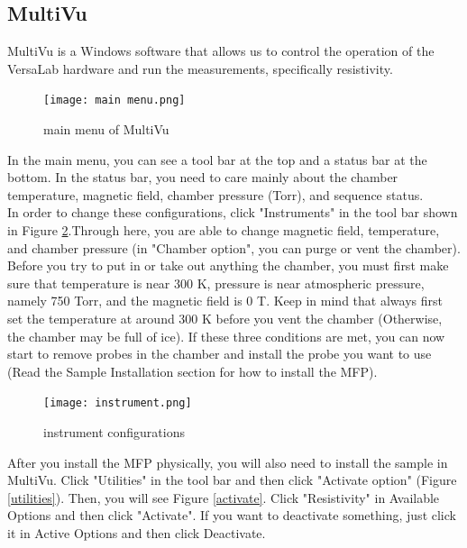 \documentclass{article}
\begin{document}
    \subsection{MultiVu}
    
        MultiVu is a Windows software that allows us to control the operation of the VersaLab hardware and run the measurements, specifically resistivity.\\
        \begin{figure}[H]
            \centering
            \texttt{[image: main menu.png]}
            \caption{main menu of MultiVu}
            \label{main menu}
        \end{figure}
        
        In the main menu, you can see a tool bar at the top and a status bar at the bottom. In the status bar, you need to care mainly about the chamber temperature, magnetic field, chamber pressure (Torr), and sequence status. \\
        In order to change these configurations, click "Instruments" in the tool bar shown in Figure \ref{instrument}.Through here, you are able to change magnetic field, temperature, and chamber pressure (in "Chamber option", you can purge or vent the chamber).\\
        Before you try to put in or take out anything the chamber, you must first make sure that temperature is near 300 K, pressure is near atmospheric pressure, namely 750 Torr, and the magnetic field is 0 T. Keep in mind that always first set the temperature at around 300 K before you vent the chamber (Otherwise, the chamber may be full of ice). If these three conditions are met, you can now start to remove probes in the chamber and install the probe you want to use (Read the Sample Installation section for how to install the MFP).\\
        
        \begin{figure}[H]
            \centering
            \texttt{[image: instrument.png]}
            \caption{instrument configurations}
            \label{instrument}
        \end{figure}

        After you install the MFP physically, you will also need to install the sample in MultiVu. Click "Utilities" in the tool bar and then click "Activate option" (Figure \ref{utilities}). Then, you will see Figure \ref{activate}. Click "Resistivity" in Available Options and then click "Activate". If you want to deactivate something, just click it in Active Options and then click Deactivate.
\end{document}

